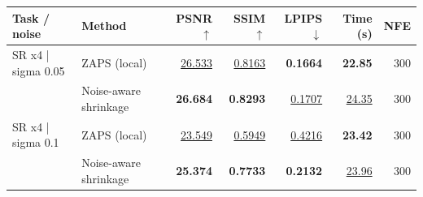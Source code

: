 \begin{tabular}{llrrrrr}
\toprule
Task / noise & Method & PSNR $\uparrow$ & SSIM $\uparrow$ & LPIPS $\downarrow$ & Time (s) & NFE \\
\midrule
SR x4 | sigma 0.05 & ZAPS (local) & \underline{26.533} & \underline{0.8163} & \textbf{0.1664} & \textbf{22.85} & 300 \\
 & Noise-aware shrinkage & \textbf{26.684} & \textbf{0.8293} & \underline{0.1707} & \underline{24.35} & 300 \\
SR x4 | sigma 0.1 & ZAPS (local) & \underline{23.549} & \underline{0.5949} & \underline{0.4216} & \textbf{23.42} & 300 \\
 & Noise-aware shrinkage & \textbf{25.374} & \textbf{0.7733} & \textbf{0.2132} & \underline{23.96} & 300 \\
\bottomrule
\end{tabular}

